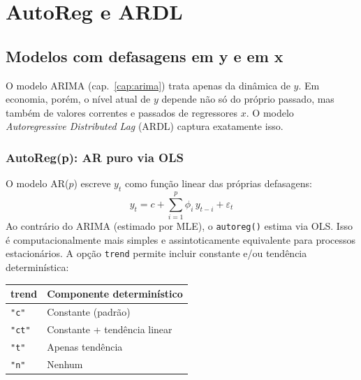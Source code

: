 \chapter{AutoReg e ARDL}
\label{cap:ardl}

\section{Modelos com defasagens em y e em x}

O modelo ARIMA (cap.~\ref{cap:arima}) trata apenas da dinâmica de $y$.
Em economia, porém, o nível atual de $y$ depende não só do próprio passado,
mas também de valores correntes e passados de regressores $x$. O modelo
\emph{Autoregressive Distributed Lag} (ARDL) captura exatamente isso.

\subsection*{AutoReg(p): AR puro via OLS}

O modelo AR($p$) escreve $y_t$ como função linear das próprias defasagens:
\[
  y_t = c + \sum_{i=1}^p \phi_i\, y_{t-i} + \varepsilon_t
\]
Ao contrário do ARIMA (estimado por MLE), o \texttt{autoreg()} estima via
OLS. Isso é computacionalmente mais simples e assintoticamente equivalente
para processos estacionários. A opção \texttt{trend} permite incluir
constante e/ou tendência determinística:

\begin{center}
\begin{tabular}{ll}
\toprule
\textbf{trend} & \textbf{Componente determinístico} \\
\midrule
\texttt{"c"}  & Constante (padrão) \\
\texttt{"ct"} & Constante + tendência linear \\
\texttt{"t"}  & Apenas tendência \\
\texttt{"n"}  & Nenhum \\
\bottomrule
\end{tabular}
\end{center}

